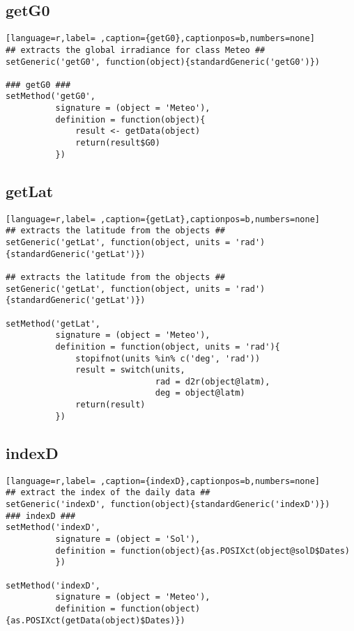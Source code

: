 \subsection{getG0}
\label{sec:orgd63a32b}
\label{subsec:getg0}
\begin{lstlisting}[language=r,label= ,caption={getG0},captionpos=b,numbers=none]
## extracts the global irradiance for class Meteo ##
setGeneric('getG0', function(object){standardGeneric('getG0')})

### getG0 ###
setMethod('getG0',
          signature = (object = 'Meteo'),
          definition = function(object){
              result <- getData(object)
              return(result$G0)
          })
\end{lstlisting}
\subsection{getLat}
\label{sec:org12c79bc}
\label{subsec:getlat}
\begin{lstlisting}[language=r,label= ,caption={getLat},captionpos=b,numbers=none]
## extracts the latitude from the objects ##
setGeneric('getLat', function(object, units = 'rad')
{standardGeneric('getLat')})

## extracts the latitude from the objects ##
setGeneric('getLat', function(object, units = 'rad')
{standardGeneric('getLat')})

setMethod('getLat',
          signature = (object = 'Meteo'),
          definition = function(object, units = 'rad'){
              stopifnot(units %in% c('deg', 'rad'))
              result = switch(units,
                              rad = d2r(object@latm),
                              deg = object@latm)
              return(result)
          })
\end{lstlisting}
\subsection{indexD}
\label{sec:org0c8be90}
\label{subsec:indexd}
\begin{lstlisting}[language=r,label= ,caption={indexD},captionpos=b,numbers=none]
## extract the index of the daily data ##
setGeneric('indexD', function(object){standardGeneric('indexD')})
### indexD ###
setMethod('indexD',
          signature = (object = 'Sol'),
          definition = function(object){as.POSIXct(object@solD$Dates)
          })

setMethod('indexD',
          signature = (object = 'Meteo'),
          definition = function(object){as.POSIXct(getData(object)$Dates)})
\end{lstlisting}

